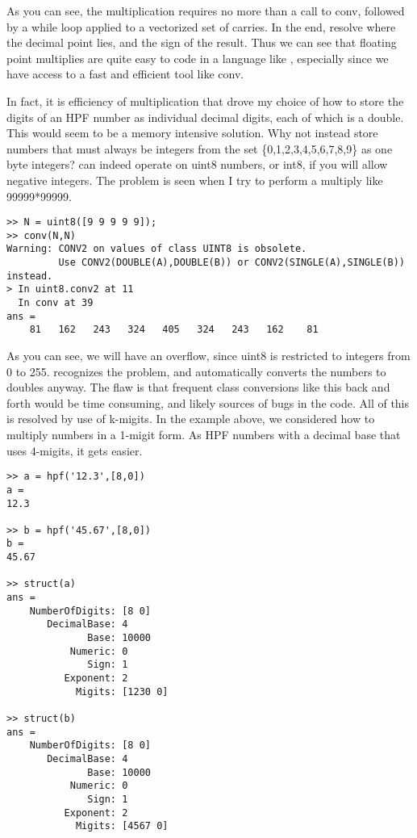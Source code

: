 \documentclass[a4paper,12pt]{article}
\begin{document}
As you can see, the multiplication requires no more than a call to conv, followed by a while loop applied to a vectorized set of carries. In the end, resolve where the decimal point lies, and the sign of the result. Thus we can see that floating point multiplies are quite easy to code in a language like \Ml, especially since we have access to a fast and efficient tool like conv.

In fact, it is efficiency of multiplication that drove my choice of how to store the digits of an HPF number as individual decimal digits, each of which is a double. This would seem to be a memory intensive solution. Why not instead store numbers that must always be integers from the set \{0,1,2,3,4,5,6,7,8,9\} as one byte integers? \Ml can indeed operate on uint8 numbers, or int8, if you will allow negative integers. The problem is seen when I try to perform a multiply like 99999*99999.

\begin{lstlisting}
>> N = uint8([9 9 9 9 9]);
>> conv(N,N)
Warning: CONV2 on values of class UINT8 is obsolete.
         Use CONV2(DOUBLE(A),DOUBLE(B)) or CONV2(SINGLE(A),SINGLE(B)) instead.
> In uint8.conv2 at 11
  In conv at 39
ans =
    81   162   243   324   405   324   243   162    81
\end{lstlisting}

As you can see, we will have an overflow, since uint8 is restricted to integers from 0 to 255. \Ml recognizes the problem, and automatically converts the numbers to doubles anyway. The flaw is that frequent class conversions like this back and forth would be time consuming, and likely sources of bugs in the code. All of this is resolved by use of k-migits. In the example above, we considered how to multiply numbers in a 1-migit form. As HPF numbers with a decimal base that uses 4-migits, it gets easier.

\begin{lstlisting}
>> a = hpf('12.3',[8,0])
a =
12.3

>> b = hpf('45.67',[8,0])
b =
45.67

>> struct(a)
ans =
    NumberOfDigits: [8 0]
       DecimalBase: 4
              Base: 10000
           Numeric: 0
              Sign: 1
          Exponent: 2
            Migits: [1230 0]

>> struct(b)
ans =
    NumberOfDigits: [8 0]
       DecimalBase: 4
              Base: 10000
           Numeric: 0
              Sign: 1
          Exponent: 2
            Migits: [4567 0]
\end{lstlisting}
\end{document}
